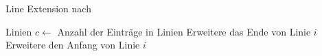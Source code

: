 \begin{algorithm}[ht]
\caption{Line Extension nach \citeauthor{hirzer08}}
\label{alg:lineextension-hirzer}
\begin{algorithmic}[1]
	\Require Linien
	\State $c \gets$ Anzahl der Einträge in Linien
		\State Erweitere das Ende von Linie $i$
		\State Erweitere den Anfang von Linie $i$
	\EndFor
\end{algorithmic}
\end{algorithm}
